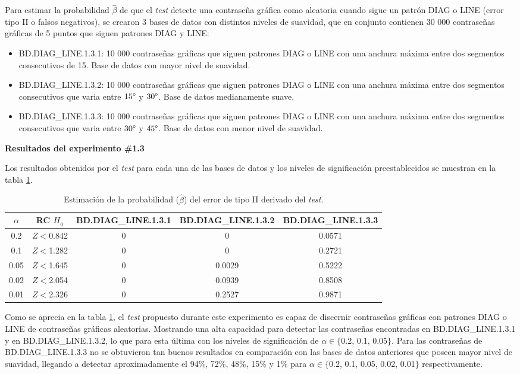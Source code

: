 \documentclass[12pt]{report}
\begin{document}
Para estimar la probabilidad $\hat{\beta}$ de que el \textit{test} detecte una contraseña gráfica como aleatoria cuando sigue un patrón DIAG o LINE  (error tipo II o falsos negativos), se crearon 3 bases de datos con distintos niveles de suavidad, que en conjunto contienen 30 000 contraseñas gráficas de 5 puntos que siguen patrones DIAG y LINE:
\begin{itemize}
	\item BD.DIAG\_LINE.1.3.1: 10 000 contraseñas gráficas que siguen patrones DIAG o LINE con una anchura máxima entre dos segmentos consecutivos de 15\degree. Base de datos con mayor nivel de suavidad. 
	\item BD.DIAG\_LINE.1.3.2: 10 000 contraseñas gráficas que siguen patrones DIAG o LINE con una anchura máxima entre dos segmentos consecutivos que varia entre $15\degree$ y $30\degree$. Base de datos medianamente suave.
	\item BD.DIAG\_LINE.1.3.3: 10 000 contraseñas gráficas que siguen patrones DIAG o LINE con una anchura máxima entre dos segmentos consecutivos que varia entre $30\degree$ y $45\degree$. Base de datos con menor nivel de suavidad.
\end{itemize}
\textbf{Resultados del experimento \#1.3}

Los resultados obtenidos por el \textit{test}  para cada una de las bases de datos y los  niveles de significación preestablecidos se muestran en la tabla \ref{tab:error2-prob}.

\begin{table}[h!]
	\centering
	\begin{tabular}{|c|c|ccc|}
		\hline
		 $\alpha$&	RC $H_a$ &BD.DIAG\_LINE.1.3.1 & BD.DIAG\_LINE.1.3.2 & BD.DIAG\_LINE.1.3.3  \\
		\hline
		0.2 & $Z<$0.842 &0     & 0          & 0.0571     \\
		0.1 & $Z<$1.282   &0     & 0          & 0.2721     \\
		0.05 &$Z<$1.645 &0     & 0.0029    & 0.5222     \\
		0.02 &$Z<$2.054  &0     & 0.0939    & 0.8508     \\
		0.01 &$Z<$2.326  &0     & 0.2527    & 0.9871     \\
		\hline
	\end{tabular}
	\caption{Estimación de la probabilidad ($\hat{\beta}$) del error de tipo II derivado del \textit{test}.}
	\label{tab:error2-prob}
\end{table}
Como se aprecia en la tabla \ref{tab:error2-prob}, el \textit{test} propuesto durante este experimento es capaz de discernir contraseñas gráficas con patrones DIAG o LINE de contraseñas gráficas aleatorias. Mostrando una alta capacidad para detectar las contraseñas encontradas en BD.DIAG\_LINE.1.3.1 y en BD.DIAG\_LINE.1.3.2, lo que para esta última con los niveles de significación de $\alpha \in \{$0.2, 0.1, 0.05$\}$. Para las contraseñas de BD.DIAG\_LINE.1.3.3 no se obtuvieron tan buenos resultados en comparación con las bases de datos anteriores que poseen mayor nivel de suavidad, llegando a detectar aproximadamente el 94\%, 72\%, 48\%, 15\% y 1\%  para $\alpha \in \{$0.2, 0.1, 0.05, 0.02, 0.01$\}$ respectivamente.
\end{document}
